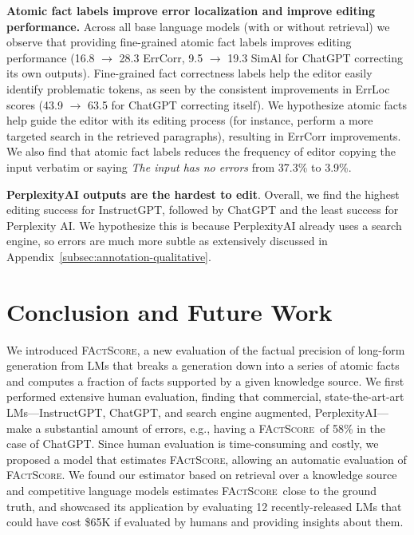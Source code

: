 \documentclass[11pt]{article}
\newcommand{\ours}{\textsc{FActScore}}
\newcommand{\kalpesh}[1]{\textcolor{brown}{[Kalpesh: #1]}
}
\begin{document}
\vspace{.3em}

\noindent \textbf{Atomic fact labels improve error localization and improve editing performance.} Across all base language models (with or without retrieval) we observe that providing fine-grained atomic fact labels improves editing performance (16.8 $\rightarrow$ 28.3 ErrCorr, 9.5 $\rightarrow$ 19.3 SimAl for ChatGPT correcting its own outputs). Fine-grained fact correctness labels help the editor easily identify problematic tokens, as seen by the consistent improvements in ErrLoc scores (43.9 $\rightarrow$ 63.5 for ChatGPT correcting itself). We hypothesize atomic facts help guide the editor with its editing process (for instance, perform a more targeted search in the retrieved paragraphs), resulting in ErrCorr improvements. We also find that atomic fact labels reduces the frequency of editor copying the input verbatim or saying \emph{The input has no errors} from 37.3\% to 3.9\%.

\vspace{.3em}

\noindent \textbf{PerplexityAI outputs are the hardest to edit}. Overall, we find the highest editing success for InstructGPT, followed by ChatGPT and the least success for Perplexity AI. We hypothesize this is because PerplexityAI already uses a search engine, so errors are much more subtle as extensively discussed in Appendix~\ref{subsec:annotation-qualitative}.





\section{Conclusion and Future Work}\label{sec:concl}
We introduced \ours, a new evaluation of the factual precision of long-form generation from LMs that breaks a generation down into a series of atomic facts and computes a fraction of facts supported by a given knowledge source.
We first performed extensive human evaluation, finding that commercial, state-the-art-art LMs---InstructGPT, ChatGPT, and search engine augmented, PerplexityAI---make a substantial amount of errors, e.g., having a \ours\ of 58\% in the case of ChatGPT.
%
Since human evaluation is time-consuming and costly, we proposed a model that estimates \ours, allowing an automatic evaluation of \ours.
We found our estimator based on retrieval over a knowledge source and competitive language models estimates \ours\ close to the ground truth, and showcased its application by evaluating 12 recently-released LMs that could have cost \$65K if evaluated by humans and providing insights about them.
\end{document}
